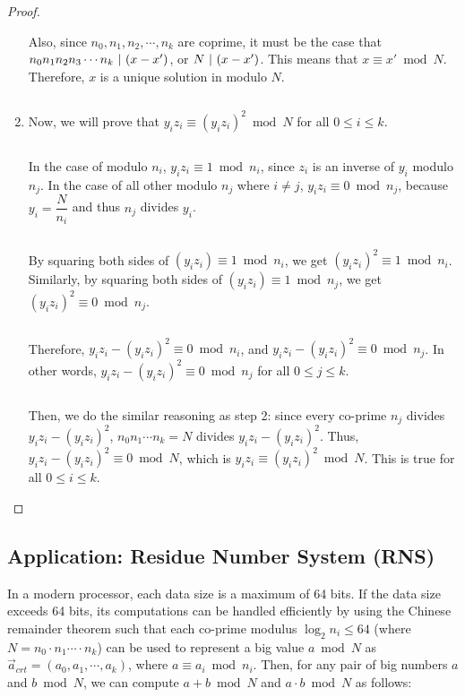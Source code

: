 \begin{proof}
\begin{enumerate}
Also, since $n_0, n_1, n_2, \cdots, n_k$ are coprime, it must be the case that $n_0n_1n_2n_3\cdots n_k \text{ } \text{$|$} \text{ } (x - x')$, or $N \text{ } \text{$|$} \text{ } (x - x')$. This means that $x \equiv x' \bmod N$. Therefore, $x$ is a unique solution in modulo $N$.

$ $

\item Now, we will prove that $y_iz_i \equiv (y_iz_i)^2 \bmod N$  \text{ } for all $0 \leq i \leq k$. 

$ $

In the case of modulo $n_i$, $y_iz_i \equiv 1 \bmod n_i$, since $z_i$ is an inverse of $y_i$ modulo $n_j$. In the case of all other modulo $n_j$ where $i \neq j$, $y_iz_i \equiv 0 \bmod n_j$, because $y_i = \dfrac{N}{n_i}$ and thus $n_j$ divides $y_i$. 

$ $

By squaring both sides of $(y_iz_i) \equiv 1 \bmod n_i$, we get $(y_iz_i)^2 \equiv 1 \bmod n_i$. Similarly, by squaring both sides of $(y_iz_i) \equiv 1 \bmod n_j$, we get $(y_iz_i)^2 \equiv 0 \bmod n_j$.

$ $

Therefore, $y_iz_i - (y_iz_i)^2 \equiv 0 \bmod n_i$, and $y_iz_i - (y_iz_i)^2 \equiv 0 \bmod n_j$. In other words, $y_iz_i - (y_iz_i)^2 \equiv 0 \bmod n_j$ for all $0 \leq j \leq k$. 

$ $

Then, we do the similar reasoning as step 2: since every co-prime $n_j$ divides $y_iz_i - (y_iz_i)^2$, $n_0n_1\cdots n_k = N$ divides $y_iz_i - (y_iz_i)^2$. Thus, $y_iz_i - (y_iz_i)^2 \equiv 0 \bmod N$, which is $y_iz_i \equiv (y_iz_i)^2 \bmod N$. This is true for all $0 \leq i \leq k$. 

\end{enumerate}

\end{proof}


\subsection{Application: Residue Number System (RNS)} 
\label{subsec:crt-application}

In a modern processor, each data size is a maximum of 64 bits. If the data size exceeds 64 bits, its computations can be handled efficiently by using the Chinese remainder theorem such that each co-prime modulus $\log_2n_i \leq 64$ (where $N = n_0\cdot n_1\cdots\cdot n_k$) can be used to represent a big value $a \bmod N$ as $\vec{a}_{\mathit{crt}} = (a_0, a_1, \cdots , a_k)$, where $a \equiv a_i \bmod n_i$. Then, for any pair of big numbers $a$ and $b \bmod N$, we can compute $a + b \bmod N$ and $a \cdot b \bmod N$ as follows: 

